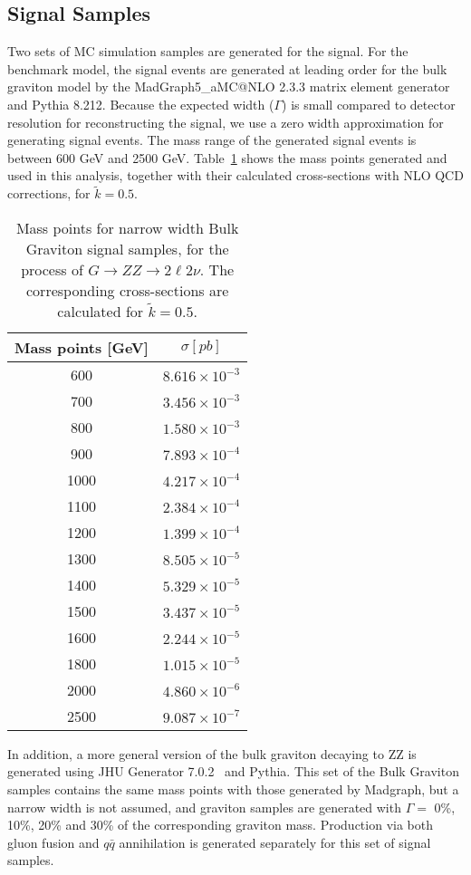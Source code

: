 \subsection{Signal Samples}
Two sets of MC simulation samples are generated for the signal. For the benchmark model, the signal events are generated at leading order for the bulk graviton model by the MadGraph5\_aMC@NLO 2.3.3 matrix element generator and Pythia 8.212. Because the expected width ($\Gamma$) is small compared to detector resolution for reconstructing the signal, we use a zero width approximation for generating signal events. The mass range of the generated signal events is between 600 GeV and 2500 GeV. Table~\ref{tab:sample_massps} shows the mass points generated and used in this analysis, together with their calculated cross-sections with NLO QCD corrections, for $\tilde{k}=0.5$.

\begin{table}[htbp]
  \begin{center}
    \caption{
      Mass points for narrow width Bulk Graviton signal samples, for the process of $G\rightarrow ZZ\rightarrow 2\ell 2\nu$. The corresponding cross-sections are calculated for $\tilde{k}=0.5$.
      \label{tab:sample_massps}}
    \begin{tabular}{c c}
      \hline\hline
      Mass points [GeV] & $\sigma [pb]$\\
      \hline
      600 &  $8.616\times 10^{-3}$ \\
      700 &  $3.456\times 10^{-3}$ \\
      800 &  $1.580\times 10^{-3}$ \\
      900 &  $7.893\times 10^{-4}$ \\
      1000 & $4.217\times 10^{-4}$ \\
      1100 & $2.384\times 10^{-4}$ \\
      1200 & $1.399\times 10^{-4}$ \\
      1300 & $8.505\times 10^{-5}$ \\
      1400 & $5.329\times 10^{-5}$ \\
      1500 & $3.437\times 10^{-5}$ \\
      1600 & $2.244\times 10^{-5}$ \\
      1800 & $1.015\times 10^{-5}$ \\
      2000 & $4.860\times 10^{-6}$ \\
      2500 & $9.087\times 10^{-7}$ \\
      \hline\hline
    \end{tabular}
  \end{center}
\end{table}


In addition, a more general version of the bulk graviton decaying to ZZ is generated using JHU Generator 7.0.2~\cite{sample_jhugen1,sample_jhugen2,sample_jhugen3} and Pythia. This set of the Bulk Graviton samples contains the same mass points with those generated by Madgraph, but a narrow width is not assumed, and graviton samples are generated with $\Gamma =$ 0\%, 10\%, 20\% and 30\% of the corresponding graviton mass. Production via both gluon fusion and $q\bar{q}$ annihilation is generated separately for this set of signal samples.
